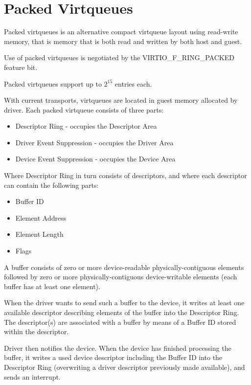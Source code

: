 \section{Packed Virtqueues}\label{sec:Basic Facilities of a Virtio Device / Packed Virtqueues}

Packed virtqueues is an alternative compact virtqueue layout using
read-write memory, that is memory that is both read and written
by both host and guest.

Use of packed virtqueues is negotiated by the VIRTIO_F_RING_PACKED
feature bit.

Packed virtqueues support up to $2^{15}$ entries each.

With current transports, virtqueues are located in guest memory
allocated by driver.
Each packed virtqueue consists of three parts:

\begin{itemize}
\item Descriptor Ring - occupies the Descriptor Area
\item Driver Event Suppression - occupies the Driver Area
\item Device Event Suppression - occupies the Device Area
\end{itemize}

Where Descriptor Ring in turn consists of descriptors,
and where each descriptor can contain the following parts:

\begin{itemize}
\item Buffer ID
\item Element Address
\item Element Length
\item Flags
\end{itemize}

A buffer consists of zero or more device-readable physically-contiguous
elements followed by zero or more physically-contiguous
device-writable elements (each buffer has at least one element).

When the driver wants to send such a buffer to the device, it
writes at least one available descriptor describing elements of
the buffer into the Descriptor Ring.  The descriptor(s) are
associated with a buffer by means of a Buffer ID stored within
the descriptor.

Driver then notifies the device. When the device has finished
processing the buffer, it writes a used device descriptor
including the Buffer ID into the Descriptor Ring (overwriting a
driver descriptor previously made available), and sends an
interrupt.

